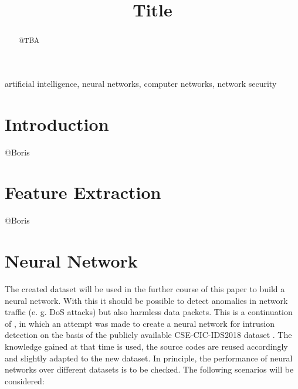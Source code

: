 \documentclass[conference]{IEEEtran}
\begin{document}
\title{Title}

\author{
\and
{}
}

\maketitle

\begin{abstract}
@TBA
\end{abstract}

\begin{IEEEkeywords}
artificial intelligence, neural networks, computer networks, network security
\end{IEEEkeywords}

\section{Introduction}
@Boris

\section{Feature Extraction}
@Boris

\section{Neural Network}
The created dataset will be used in the further course of this paper to build a neural network. With this it should be possible to detect anomalies in network traffic (e. g. DoS attacks) but also harmless data packets. This is a continuation of  \cite{max1}, in which an attempt was made to create a neural network for intrusion detection on the basis of the publicly available CSE-CIC-IDS2018 dataset  \cite{max2}. The knowledge gained at that time is used, the source codes are reused accordingly and slightly adapted to the new dataset. In principle, the performance of neural networks over different datasets is to be checked. The following scenarios will be considered:
\smallskip
\end{document}

